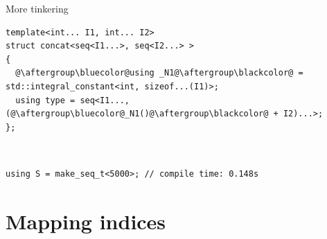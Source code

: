 \documentclass[xcolor=dvipsnames]{beamer}
\begin{document}
\begin{frame}[fragile]{More tinkering}
\begin{lstlisting}
template<int... I1, int... I2>
struct concat<seq<I1...>, seq<I2...> >
{
  @\aftergroup\bluecolor@using _N1@\aftergroup\blackcolor@ = std::integral_constant<int, sizeof...(I1)>;
  using type = seq<I1..., (@\aftergroup\bluecolor@_N1()@\aftergroup\blackcolor@ + I2)...>;
};
\end{lstlisting}

~

\begin{lstlisting}
using S = make_seq_t<5000>; // compile time: 0.148s
\end{lstlisting}
\end{frame}



\section{Mapping indices}
\end{document}
